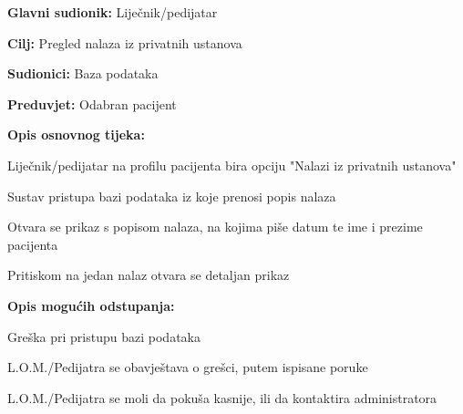 					\noindent {}
					\begin{packed_item}
						
						\item \textbf{Glavni sudionik: }Liječnik/pedijatar
						\item  \textbf{Cilj:} Pregled nalaza iz privatnih ustanova
						\item  \textbf{Sudionici:} Baza podataka
						\item  \textbf{Preduvjet:} Odabran pacijent
						\item  \textbf{Opis osnovnog tijeka:}
						
						\item[] \begin{packed_enum}
							
							\item Liječnik/pedijatar na profilu pacijenta bira opciju "Nalazi iz privatnih ustanova"
							\item Sustav pristupa bazi podataka iz koje prenosi popis nalaza
							\item Otvara se prikaz s popisom nalaza, na kojima piše datum te ime i prezime pacijenta
							\item Pritiskom na jedan nalaz otvara se detaljan prikaz
						\end{packed_enum}
						\item \textbf{Opis mogućih odstupanja:}
						\item[] \begin{packed_item}
							\item[2.a] Greška pri pristupu bazi podataka
							\item[] \begin{packed_enum}
								
								\item L.O.M./Pedijatra se obavještava o grešci, putem ispisane poruke
								\item L.O.M./Pedijatra se moli da pokuša kasnije, ili da kontaktira administratora
								
							\end{packed_enum}
						\end{packed_item}
					\end{packed_item}
					
